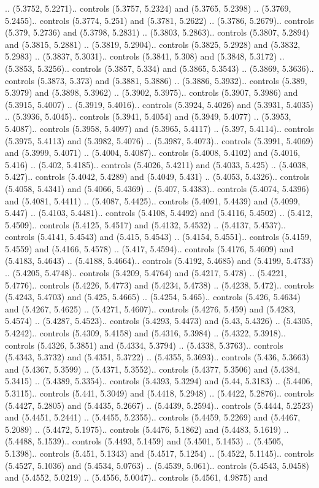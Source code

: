 .. (5.3752, 5.2271).. controls (5.3757, 5.2324) and (5.3765, 5.2398) .. (5.3769, 5.2455).. controls (5.3774, 5.251) and (5.3781, 5.2622) .. (5.3786, 5.2679).. controls (5.379, 5.2736) and (5.3798, 5.2831) .. (5.3803, 5.2863).. controls (5.3807, 5.2894) and (5.3815, 5.2881) .. (5.3819, 5.2904).. controls (5.3825, 5.2928) and (5.3832, 5.2983) .. (5.3837, 5.3031).. controls (5.3841, 5.308) and (5.3848, 5.3172) .. (5.3853, 5.3256).. controls (5.3857, 5.334) and (5.3865, 5.3543) .. (5.3869, 5.3636).. controls (5.3873, 5.373) and (5.3881, 5.3886) .. (5.3886, 5.3932).. controls (5.389, 5.3979) and (5.3898, 5.3962) .. (5.3902, 5.3975).. controls (5.3907, 5.3986) and (5.3915, 5.4007) .. (5.3919, 5.4016).. controls (5.3924, 5.4026) and (5.3931, 5.4035) .. (5.3936, 5.4045).. controls (5.3941, 5.4054) and (5.3949, 5.4077) .. (5.3953, 5.4087).. controls (5.3958, 5.4097) and (5.3965, 5.4117) .. (5.397, 5.4114).. controls (5.3975, 5.4113) and (5.3982, 5.4076) .. (5.3987, 5.4073).. controls (5.3991, 5.4069) and (5.3999, 5.4071) .. (5.4004, 5.4087).. controls (5.4008, 5.4102) and (5.4016, 5.416) .. (5.402, 5.4185).. controls (5.4026, 5.4211) and (5.4033, 5.425) .. (5.4038, 5.427).. controls (5.4042, 5.4289) and (5.4049, 5.431) .. (5.4053, 5.4326).. controls (5.4058, 5.4341) and (5.4066, 5.4369) .. (5.407, 5.4383).. controls (5.4074, 5.4396) and (5.4081, 5.4411) .. (5.4087, 5.4425).. controls (5.4091, 5.4439) and (5.4099, 5.447) .. (5.4103, 5.4481).. controls (5.4108, 5.4492) and (5.4116, 5.4502) .. (5.412, 5.4509).. controls (5.4125, 5.4517) and (5.4132, 5.4532) .. (5.4137, 5.4537).. controls (5.4141, 5.4543) and (5.415, 5.4543) .. (5.4154, 5.4551).. controls (5.4159, 5.4559) and (5.4166, 5.4578) .. (5.417, 5.4594).. controls (5.4176, 5.4609) and (5.4183, 5.4643) .. (5.4188, 5.4664).. controls (5.4192, 5.4685) and (5.4199, 5.4733) .. (5.4205, 5.4748).. controls (5.4209, 5.4764) and (5.4217, 5.478) .. (5.4221, 5.4776).. controls (5.4226, 5.4773) and (5.4234, 5.4738) .. (5.4238, 5.472).. controls (5.4243, 5.4703) and (5.425, 5.4665) .. (5.4254, 5.465).. controls (5.426, 5.4634) and (5.4267, 5.4625) .. (5.4271, 5.4607).. controls (5.4276, 5.459) and (5.4283, 5.4574) .. (5.4287, 5.4523).. controls (5.4293, 5.4473) and (5.43, 5.4326) .. (5.4305, 5.4242).. controls (5.4309, 5.4158) and (5.4316, 5.3984) .. (5.4322, 5.3918).. controls (5.4326, 5.3851) and (5.4334, 5.3794) .. (5.4338, 5.3763).. controls (5.4343, 5.3732) and (5.4351, 5.3722) .. (5.4355, 5.3693).. controls (5.436, 5.3663) and (5.4367, 5.3599) .. (5.4371, 5.3552).. controls (5.4377, 5.3506) and (5.4384, 5.3415) .. (5.4389, 5.3354).. controls (5.4393, 5.3294) and (5.44, 5.3183) .. (5.4406, 5.3115).. controls (5.441, 5.3049) and (5.4418, 5.2948) .. (5.4422, 5.2876).. controls (5.4427, 5.2805) and (5.4435, 5.2667) .. (5.4439, 5.2594).. controls (5.4444, 5.2523) and (5.4451, 5.2441) .. (5.4455, 5.2355).. controls (5.4459, 5.2269) and (5.4467, 5.2089) .. (5.4472, 5.1975).. controls (5.4476, 5.1862) and (5.4483, 5.1619) .. (5.4488, 5.1539).. controls (5.4493, 5.1459) and (5.4501, 5.1453) .. (5.4505, 5.1398).. controls (5.451, 5.1343) and (5.4517, 5.1254) .. (5.4522, 5.1145).. controls (5.4527, 5.1036) and (5.4534, 5.0763) .. (5.4539, 5.061).. controls (5.4543, 5.0458) and (5.4552, 5.0219) .. (5.4556, 5.0047).. controls (5.4561, 4.9875) and 
